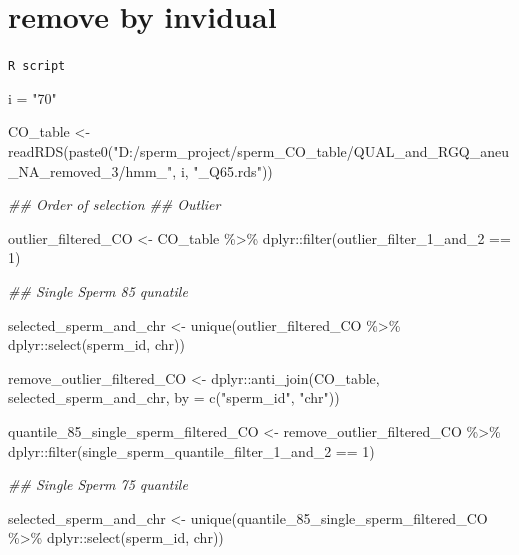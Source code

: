 \documentclass[
  letterpaper,
  DIV=11,
  numbers=noendperiod]{scrreprt}
\newenvironment{Shaded}{\begin{snugshade}}{\end{snugshade}}
\newcommand{\AttributeTok}[1]{\textcolor[rgb]{0.40,0.45,0.13}{#1}}
\newcommand{\DecValTok}[1]{\textcolor[rgb]{0.68,0.00,0.00}{#1}}
\newcommand{\DocumentationTok}[1]{\textcolor[rgb]{0.37,0.37,0.37}{\textit{#1}}}
\newcommand{\FunctionTok}[1]{\textcolor[rgb]{0.28,0.35,0.67}{#1}}
\newcommand{\NormalTok}[1]{\textcolor[rgb]{0.00,0.23,0.31}{#1}}
\newcommand{\OtherTok}[1]{\textcolor[rgb]{0.00,0.23,0.31}{#1}}
\newcommand{\SpecialCharTok}[1]{\textcolor[rgb]{0.37,0.37,0.37}{#1}}
\newcommand{\StringTok}[1]{\textcolor[rgb]{0.13,0.47,0.30}{#1}}
\begin{document}
\hypertarget{remove-by-invidual}{%
\section{remove by invidual}\label{remove-by-invidual}}

\begin{codelisting}

\caption{\texttt{R script}}

\begin{Shaded}
\begin{Highlighting}[]
\NormalTok{i }\OtherTok{=} \StringTok{"70"}

\NormalTok{CO\_table }\OtherTok{\textless{}{-}} \FunctionTok{readRDS}\NormalTok{(}\FunctionTok{paste0}\NormalTok{(}\StringTok{"D:/sperm\_project/sperm\_CO\_table/QUAL\_and\_RGQ\_aneu\_NA\_removed\_3/hmm\_"}\NormalTok{, i, }\StringTok{"\_Q65.rds"}\NormalTok{))}

\DocumentationTok{\#\# Order of selection}
\DocumentationTok{\#\# Outlier}

\NormalTok{outlier\_filtered\_CO }\OtherTok{\textless{}{-}}\NormalTok{ CO\_table }\SpecialCharTok{\%\textgreater{}\%}\NormalTok{ dplyr}\SpecialCharTok{::}\FunctionTok{filter}\NormalTok{(outlier\_filter\_1\_and\_2 }\SpecialCharTok{==} \DecValTok{1}\NormalTok{)}


\DocumentationTok{\#\# Single Sperm 85 qunatile}

\NormalTok{selected\_sperm\_and\_chr }\OtherTok{\textless{}{-}} \FunctionTok{unique}\NormalTok{(outlier\_filtered\_CO }\SpecialCharTok{\%\textgreater{}\%}\NormalTok{ dplyr}\SpecialCharTok{::}\FunctionTok{select}\NormalTok{(sperm\_id, chr))}

\NormalTok{remove\_outlier\_filtered\_CO }\OtherTok{\textless{}{-}}\NormalTok{ dplyr}\SpecialCharTok{::}\FunctionTok{anti\_join}\NormalTok{(CO\_table, selected\_sperm\_and\_chr, }\AttributeTok{by =} \FunctionTok{c}\NormalTok{(}\StringTok{"sperm\_id"}\NormalTok{, }\StringTok{"chr"}\NormalTok{))}

\NormalTok{quantile\_85\_single\_sperm\_filtered\_CO }\OtherTok{\textless{}{-}}\NormalTok{ remove\_outlier\_filtered\_CO }\SpecialCharTok{\%\textgreater{}\%}\NormalTok{ dplyr}\SpecialCharTok{::}\FunctionTok{filter}\NormalTok{(single\_sperm\_quantile\_filter\_1\_and\_2 }\SpecialCharTok{==} \DecValTok{1}\NormalTok{)}


\DocumentationTok{\#\# Single Sperm 75 quantile }

\NormalTok{selected\_sperm\_and\_chr }\OtherTok{\textless{}{-}} \FunctionTok{unique}\NormalTok{(quantile\_85\_single\_sperm\_filtered\_CO }\SpecialCharTok{\%\textgreater{}\%}\NormalTok{ dplyr}\SpecialCharTok{::}\FunctionTok{select}\NormalTok{(sperm\_id, chr))}


\end{Highlighting}
\end{Shaded}
\end{codelisting}
\end{document}
